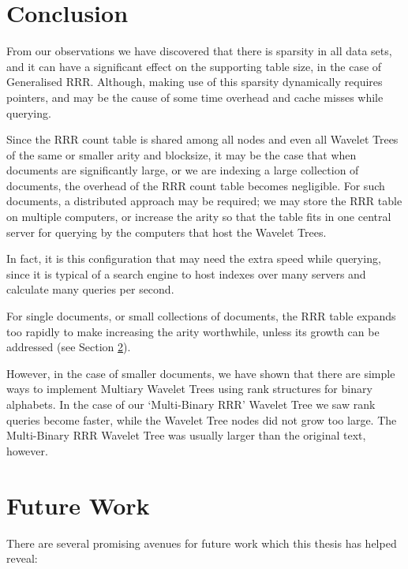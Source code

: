 \section{Conclusion}
\label{sec:conclusion}

From our observations we have discovered that there is sparsity in all data 
sets, and it can have a significant effect on the supporting table size, in
the case of Generalised RRR. Although, making use of this sparsity dynamically
requires pointers, and may be the cause of some time overhead and cache misses 
while querying.

Since the RRR count table is shared among all nodes and even all Wavelet Trees
of the same or smaller arity and blocksize, it may be the case that when 
documents are significantly large, or we are indexing a large collection of 
documents, the overhead of the RRR count table becomes negligible. For such 
documents, a distributed approach may be required; we may store the RRR table on
multiple computers, or increase the arity so that the table fits in one central
server for querying by the computers that host the Wavelet Trees.

In fact, it is this configuration that may need the extra speed while querying,
since it is typical of a search engine to host indexes over many servers and
calculate many queries per second.

For single documents, or small collections of documents, the RRR table expands 
too rapidly to make increasing the arity worthwhile, unless its growth can be 
addressed (see Section \ref{sec:future}).

However, in the case of smaller documents, we have shown that there are simple 
ways to implement Multiary Wavelet Trees using rank structures for binary 
alphabets. In the case of our `Multi-Binary RRR' Wavelet Tree we saw rank 
queries become faster, while the Wavelet Tree nodes did not grow too large. The
Multi-Binary RRR Wavelet Tree was usually larger than the original text, 
however.

\section{Future Work}
\label{sec:future}
There are several promising avenues for future work which this thesis has helped
reveal:

